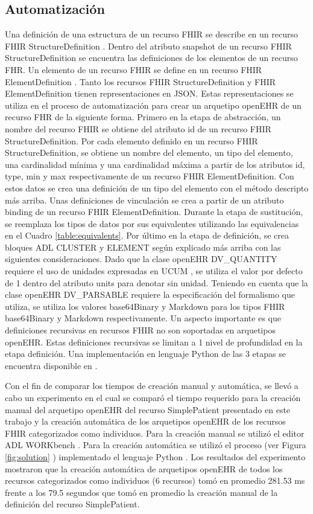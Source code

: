 \subsection{Automatización}

Una definición de una estructura de un recurso FHIR se describe en un recurso FHIR StructureDefinition \cite{FHIRStructureDefinition}. Dentro del atributo snapshot de un recurso FHIR StructureDefinition se encuentra las definiciones de los elementos de un recurso FHR. Un elemento de un recurso FHIR se define en un recurso FHIR ElementDefinition \cite{FHIRElementDefinition}. Tanto los recursos FHIR StructureDefinition y FHIR ElementDefinition tienen representaciones en JSON. Estas representaciones se utiliza en el proceso de automatización para crear un arquetipo openEHR de un recurso FHR de la siguiente forma. Primero en la etapa de abstracción, un nombre del recurso FHIR se obtiene del atributo id de un recurso FHIR StructureDefinition. Por cada elemento definido en un recurso FHIR StructureDefinition, se obtiene un nombre del elemento, un tipo del elemento, una cardinalidad mínima y una cardinalidad máxima a partir de los atributos id, type, min y max respectivamente de un recurso FHIR ElementDefinition. Con estos datos se crea una definición de un tipo del elemento con el método descripto más arriba. Unas definiciones de vinculación se crea a partir de un atributo binding de un recurso FHIR ElementDefinition. Durante la etapa de sustitución, se reemplaza los tipos de datos por sus equivalentes utilizando las equivalencias en el Cuadro \ref{table:equivalents}. Por último en la etapa de definición, se crea bloques ADL CLUSTER y ELEMENT según explicado más arriba con las siguientes consideraciones. Dado que la clase openEHR DV\_QUANTITY requiere el uso de unidades expresadas en UCUM \cite{UCUM}, se utiliza el valor por defecto de 1 dentro del atributo units para denotar sin unidad. Teniendo en cuenta que la clase openEHR DV\_PARSABLE requiere la especificación del formalismo que utiliza, se utiliza los valores base64Binary y Markdown para los tipos FHIR base64Binary y Markdown respectivamente. Un aspecto importante es que definiciones recursivas en recursos FHIR no son soportadas en arquetipos openEHR. Estas definiciones recursivas se limitan a 1 nivel de profundidad en la etapa definición. Una implementación en lenguaje Python de las 3 etapas se encuentra disponible en \cite{PythonImplementation}.

Con el fin de comparar los tiempos de creación manual y automática, se llevó a cabo un experimento en el cual se comparó el tiempo requerido para la creación manual del arquetipo openEHR del recurso SimplePatient presentado en este trabajo  y la creación automática de los arquetipos openEHR de los recursos FHIR categorizados como individuos. Para la creación manual se utilizó el editor ADL WORKbench \cite{ADLWORKbench}. Para la creación automática se utilizó el proceso (ver Figura \ref{fig:solution} ) implementado el lenguaje Python \cite{PythonImplementation}. Los resultados del experimento mostraron que la creación automática de arquetipos openEHR de todos los recursos categorizados como individuos (6 recursos) tomó en promedio 281.53 ms frente a los 79.5 segundos que tomó en promedio la creación manual de la definición del recurso SimplePatient.
